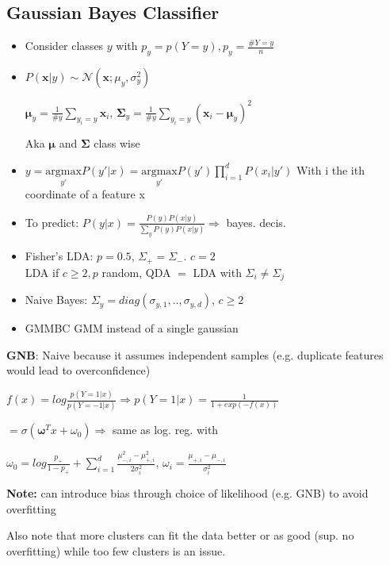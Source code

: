 \subsection{Gaussian Bayes Classifier}

\begin{itemize}
    \item Consider classes $y$ with $p_y = p(Y=y), p_y = \frac{\# Y=y}{n}$
    \item $P(\boldsymbol{x}|y) \sim \mathcal{N}(\boldsymbol{x};\mu_y,\sigma_{y}^2)$

    $\boldsymbol{\mu}_{y} = \frac{1}{\# y}\sum_{y_i=y}\boldsymbol{x}_i$, $\boldsymbol{\Sigma}_y = \frac{1}{\# y}\sum_{y_i=y} (\boldsymbol{x}_i-\boldsymbol{\mu}_{y})^2$

    Aka $\boldsymbol{\mu}$ and $\boldsymbol{\Sigma}$ class wise
    \item $y = \underset{y'}{\text{argmax}}P(y'|x) = \underset{y'}{\text{argmax}}P(y')\prod_{i=1}^dP(x_i|y')$
    With i the ith coordinate of a feature x
    \item To predict: $P(y|x) = \frac{P(y)P(x|y)}{\sum_yP(y)P(x|y)} \Rightarrow$ bayes. decis.
    \item Fisher's LDA: $p = 0.5$, $\Sigma_+ = \Sigma_-$. $c=2$\\
    LDA if $c\geq 2, p$ random, QDA $=$ LDA with $\Sigma_i \neq \Sigma_j$
    \item Naive Bayes: $\Sigma_y = diag(\sigma_{y,1},..,\sigma_{y,d})$, $c\geq 2$
    \item GMMBC GMM instead of a single gaussian 
\end{itemize}
\textbf{GNB}: Naive because it assumes independent samples (e.g. duplicate features would lead to overconfidence)

$f(x) = log\frac{p(Y=1|x)}{p(Y=-1|x)} \Rightarrow p(Y=1|x) = \frac{1}{1+exp(-f(x))}$

$= \sigma(\boldsymbol{\omega}^Tx + \omega_0) \Rightarrow$ same as log. reg. with

$\omega_0 = log\frac{p_+}{1-p_+} + \sum_{i=1}^d\frac{\mu_{-,i}^2 - \mu_{+,i}^2}{2\sigma_i^2}$, $\omega_i = \frac{\mu_{+,i} - \mu_{-,i}}{\sigma_i^2}$

\textbf{Note:} can introduce bias through choice of likelihood (e.g. GNB) to avoid overfitting

Also note that more clusters can fit the data better or as good (sup. no overfitting) while too few clusters is an issue.
